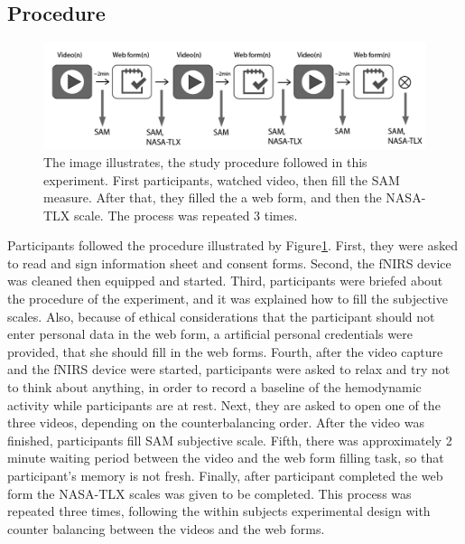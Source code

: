 \documentclass[../main/Feedback.tex]{subfiles}
\begin{document}
\subsection{Procedure}
\begin{figure}[h]
	\centering
	\includegraphics[width=0.8\linewidth]{../figures/study-procedure}
	\caption[study procedure]{The image illustrates, the study procedure followed in this experiment. First participants, watched video, then fill the SAM measure. After that, they filled the a web form, and then the NASA-TLX scale. The process was repeated 3 times.}
	\label{fig:study-procedure}
\end{figure}		
Participants followed the procedure illustrated by Figure\ref{fig:study-procedure}. First, they were asked to read and sign information sheet and consent forms. Second, the fNIRS device was cleaned then equipped and started. Third, participants were briefed about the procedure of the experiment, and it was explained how to fill the subjective scales. Also, because of ethical considerations that the participant should not enter personal data in the web form, a artificial personal credentials were provided, that she should fill in the web forms. Fourth, after the video capture and the fNIRS device were started, participants were asked to relax and try not to think about anything, in order to record a baseline of the hemodynamic activity while participants are at rest. Next, they are asked to open one of the three videos, depending on the counterbalancing order. After the video was finished, participants fill SAM subjective scale. Fifth, there was approximately 2 minute waiting period between the video and the web form filling task, so that participant's memory is not fresh. Finally, after participant completed the web form the NASA-TLX scales was given to be completed. This process was repeated three times, following the within subjects experimental design with counter balancing between the videos and the web forms.
\end{document}
